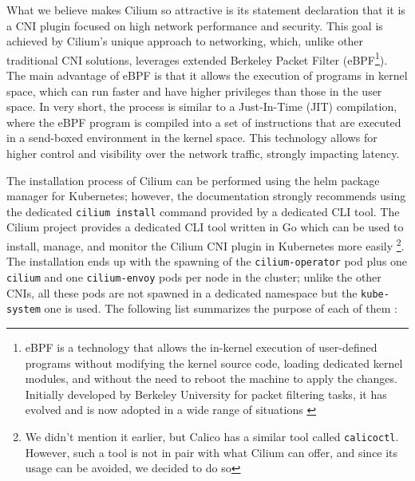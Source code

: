 What we believe makes Cilium so attractive is its statement declaration that it
is a CNI plugin focused on high network performance and security. This goal is
achieved by Cilium's unique approach to networking, which, unlike other
traditional CNI solutions, leverages extended Berkeley Packet Filter
(eBPF\footnote{eBPF is a technology that allows the in-kernel execution of
user-defined programs without modifying the kernel source code, loading
dedicated kernel modules, and without the need to reboot the machine to apply
the changes. Initially developed by Berkeley University for packet filtering
tasks, it has evolved and is now adopted in a wide range of situations
\cite{Hedam2021}}). The main advantage of eBPF is that it allows the execution
of programs in kernel space, which can run faster and have higher privileges
than those in the user space. In very short, the process is similar to a
Just-In-Time (JIT) compilation, where the eBPF program is compiled into a set of
instructions that are executed in a send-boxed environment in the kernel
space\cite{Sharaf2022}. This technology allows for higher control and visibility
over the network traffic, strongly impacting latency.

The installation process of Cilium can be performed using the helm package
manager for Kubernetes; however, the documentation strongly recommends using the
dedicated \texttt{cilium install} command provided by a dedicated CLI tool.
The Cilium project provides a dedicated CLI tool written in Go which can be used
to install, manage, and monitor the Cilium CNI plugin in Kubernetes more easily
\footnote{
  We didn't mention it earlier, but Calico has a similar tool called
  \texttt{calicoctl}.
  However, such a tool is not in pair with what Cilium can offer, and since its
  usage can be avoided, we decided to do so
}.
The installation ends up with the spawning of the \texttt{cilium-operator} pod
plus one \texttt{cilium} and one \texttt{cilium-envoy} pods per node in the
cluster; unlike the other CNIs, all these pods are not spawned in a dedicated
namespace but the \texttt{kube-system} one is used.
The following list summarizes the purpose of each of them
\cite{ciliumdoc-components, ciliumdoc-envoy}:

